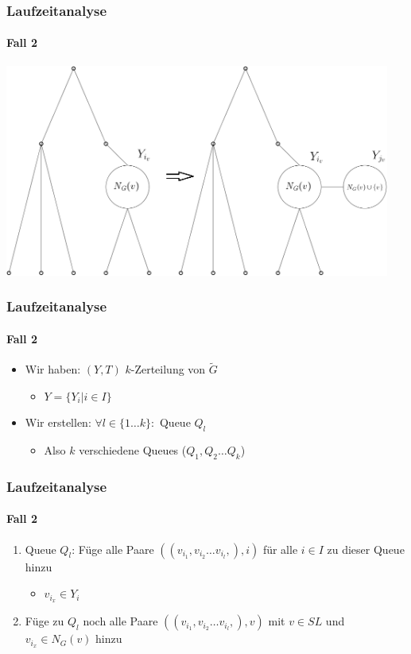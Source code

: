 \begin{frame}
\frametitle{Laufzeitanalyse}
\framesubtitle{Fall 2}

\includegraphics[width=0.95\textwidth]{images/Graph_zuruck.png}

\end{frame}



\begin{frame}
\frametitle{Laufzeitanalyse}
\framesubtitle{Fall 2}

\begin{itemize}
	\item Wir haben: $(Y,T)$ $k$-Zerteilung von $\widetilde{G}$
	\begin{itemize}
		\item $Y = \{ Y_i | i \in I \}$
	\end{itemize}

	\item Wir erstellen: $\forall l \in \{1 \dots k\}:$ Queue $Q_l$
	\begin{itemize}
		\item Also $k$ verschiedene Queues ($Q_1, Q_2 \dots Q_k$)
	\end{itemize}
\end{itemize}

\end{frame}


\begin{frame}
\frametitle{Laufzeitanalyse}
\framesubtitle{Fall 2}

\begin{enumerate}
	\item Queue $Q_l$: Füge alle Paare $((v_{i_1}, v_{i_2} \dots v_{i_l},), i)$ für alle $i \in I$ zu dieser Queue hinzu
	\begin{itemize}
		\item $v_{i_x} \in Y_i$
	\end{itemize}
	
	\item Füge zu $Q_l$ noch alle Paare $((v_{i_1}, v_{i_2} \dots v_{i_l},), v)$ mit $v \in SL$ und $v_{i_x} \in N_G(v)$ hinzu 
\end{enumerate}

\end{frame}

